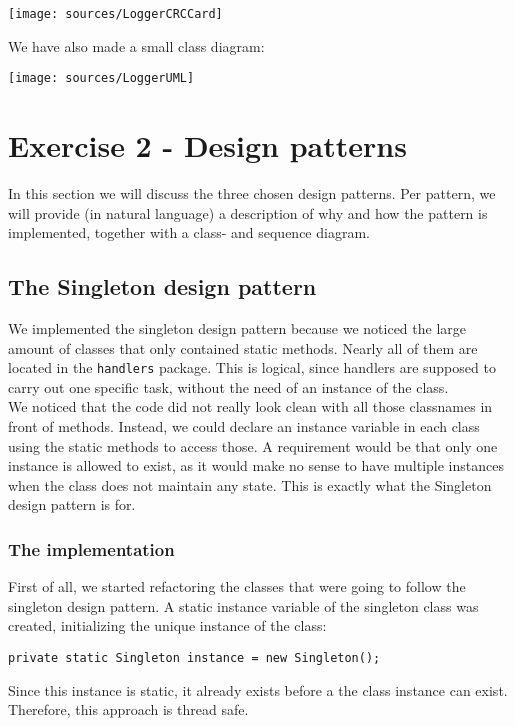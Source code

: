 \documentclass[a4paper,11pt,report]{scrartcl}
\begin{document}
\centerline{\texttt{[image: sources/LoggerCRCCard]}}

We have also made a small class diagram:\\

\newpage\centerline{\texttt{[image: sources/LoggerUML]}}

\newpage\section{Exercise 2 - Design patterns}
In this section we will discuss the three chosen design patterns. Per pattern,
we will provide (in natural language) a description of why and how the pattern
is implemented, together with a class- and sequence diagram.

\subsection{The Singleton design pattern}
We implemented the singleton design pattern because we noticed the large amount
of classes that only contained static methods. Nearly all of them are located in
the \texttt{handlers} package. This is logical, since handlers are supposed to carry out
one specific task, without the need of an instance of the class.\\

We noticed that the code did not really look clean with all those classnames in
front of methods. Instead, we could declare an instance variable in each class
using the static methods to access those. A requirement would be that only one
instance is allowed to exist, as it would make no sense to have multiple
instances when the class does not maintain any state. This is exactly what the
Singleton design pattern is for.

\subsubsection{The implementation}
First of all, we started refactoring the classes that were going to follow the
singleton design pattern. A static instance variable of the singleton class was
created, initializing the unique instance of the class:
\begin{verbatim}
private static Singleton instance = new Singleton();
\end{verbatim}
\newpage Since this instance is static, it already exists before a the class instance
can exist. Therefore, this approach is thread safe.\\
\end{document}
